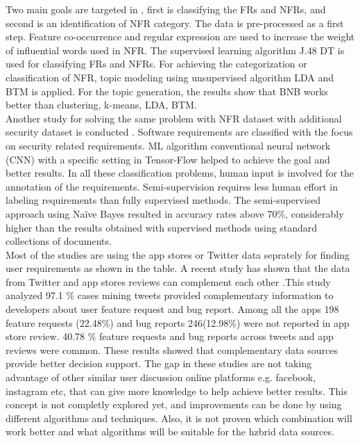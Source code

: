 	Two main goals are targeted in \cite{Abad},
first is classifying the FRs and NFRs, and second is an identification of NFR category. The data is
pre-processed as a first step. Feature co-occurrence and regular expression are used to increase
the weight of influential words used in NFR. The supervised learning algorithm J.48 DT is used
for classifying FRs and NFRs. For achieving the categorization or classification of NFR,
topic modeling using unsupervised algorithm LDA and BTM is applied. For the topic generation, the results show  that BNB works better than clustering, k-means, LDA, BTM. \\


	Another study for solving the same problem with NFR dataset with additional security dataset is conducted \cite{Dekhtyar}.
Software requirements are classified with the focus on security related requirements. ML algorithm
conventional neural network (CNN) with a specific setting in Tensor-Flow helped to achieve the goal and better results. In all
these classification problems, human input is involved for the annotation of the requirements.
Semi-supervision requires less human effort in labeling requirements than fully supervised
methods. The semi-supervised approach \cite{Casamayor} using Naïve Bayes resulted in accuracy rates
above 70\%, considerably higher than the results obtained with supervised methods using
standard collections of documents.\\

	 Most of the studies are using the app stores or Twitter data seprately for finding user requirements as shown in the table. A recent study has shown that the data from Twitter and app
stores reviews can complement each other \cite{Nayebi}.This study analyzed  97.1 \% cases mining tweets provided complementary information to developers about user 
feature request and bug report. Among all the apps 198 feature requests (22.48\%) and bug reports 246(12.98\%) were not reported in app store review. 
40.78 \% feature requests and bug reports across tweets and app reviews were common. These results showed that complementary data sources 
provide better decision support. The gap in these studies are not taking advantage of other
similar user discussion online platforms e.g. facebook, instagram etc, that can give more knowledge to help achieve better results. 
This concept is not completly explored yet, and improvements can be done by using different
algorithms and techniques. Also, it is not proven which combination will work better and what algorithms will be suitable for the hzbrid data sources. \\

